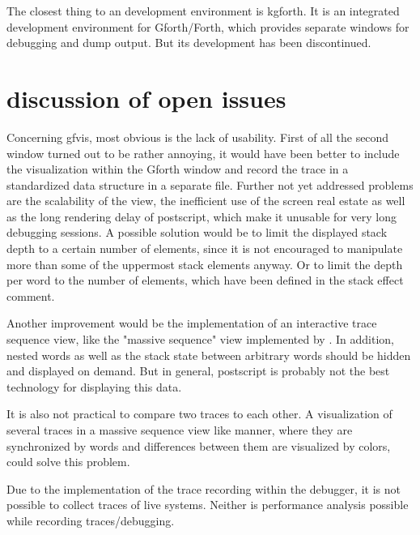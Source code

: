 The closest thing to an development environment is kgforth. It is an integrated development environment for Gforth/Forth, which provides separate windows for debugging and dump output. But its development has been discontinued.

\section{discussion of open issues}

Concerning gfvis, most obvious is the lack of usability. First of all the second window turned out to be rather annoying, it would have been better to include the visualization within the Gforth window and record the trace in a standardized data structure in a separate file.
Further not yet addressed problems are the scalability of the view, the inefficient use of the screen real estate as well as the long rendering delay of postscript, which make it unusable for very long debugging sessions. A possible solution would be to limit the displayed stack depth to a certain number of elements, since it is not encouraged to manipulate more than some of the uppermost stack elements anyway. Or to limit the depth per word to the number of elements, which have been defined in the stack effect comment.

Another improvement would be the implementation of an interactive trace sequence view, like the "massive sequence" view implemented by \cite{Cornelissen:2008:ETA:1454787.1454981}. In addition, nested words as well as the stack state between arbitrary words should be hidden and displayed on demand. But in general, postscript is probably not the best technology for displaying this data.

It is also not practical to compare two traces to each other. A visualization of several traces in a massive sequence view like manner, where they are synchronized by words and differences between them are visualized by colors, could solve this problem.

Due to the implementation of the trace recording within the debugger, it is not possible to collect traces of live systems. Neither is performance analysis possible while recording traces/debugging.
 


